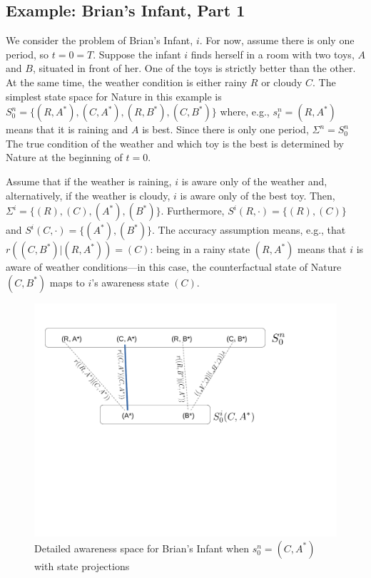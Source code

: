 \documentclass[
11pt,
titlepage,
reqno,
]{article}%
\theoremstyle{definition}
\begin{document}
\subsection{Example: Brian's Infant, Part 1}	
	We consider the problem of Brian's Infant, $i$. For now, assume there is only one period, so $t=0=T$.  Suppose the infant $i$ finds herself in a room with two toys, $A$ and $B$, situated in front of her.  One of the toys is strictly better than the other. At the same time, the weather condition is either rainy $R$ or cloudy $C$. The simplest state space for Nature in this example is $S^n_0=\{(R,A^\ast),(C,A^\ast),(R,B^\ast),(C,B^\ast)\}$ where, e.g., $s^n_t=(R,A^\ast)$ means that it is raining and $A$ is best. Since there is only one period, $\Sigma^n=S^n_0$ The true condition of the weather and which toy is the best is determined by Nature at the beginning of $t=0$. 
	
	Assume that if the weather is raining, $i$ is aware only of the weather and, alternatively, if the weather is cloudy, $i$ is aware only of the best toy. Then,  $\Sigma^i=\{(R),(C),(A^\ast),(B^\ast)\}$. Furthermore,  $S^i(R,\cdot)=\{(R),(C)\}$ and $S^i(C,\cdot)=\{(A^\ast),(B^\ast)\}$. The accuracy assumption means, e.g., that $r((C,B^\ast)|(R,A^\ast))=(C)$: being in a rainy state $(R,A^\ast)$ means that $i$ is aware of weather conditions---in this case, the counterfactual state of Nature $(C,B^\ast)$ maps to $i$'s awareness state $(C)$.
	
	\begin{figure}[h!]
		\centering
		\includegraphics*[page=1,trim = 0in 3in 1.5in 0in,scale=.7]{Awareness_Diagrams_All}
		\caption{Detailed awareness space for Brian's Infant when $s^n_0=(C,A^\ast)$ with state projections\label{Diag: p-01}}%
	\end{figure}
	
\end{document}

